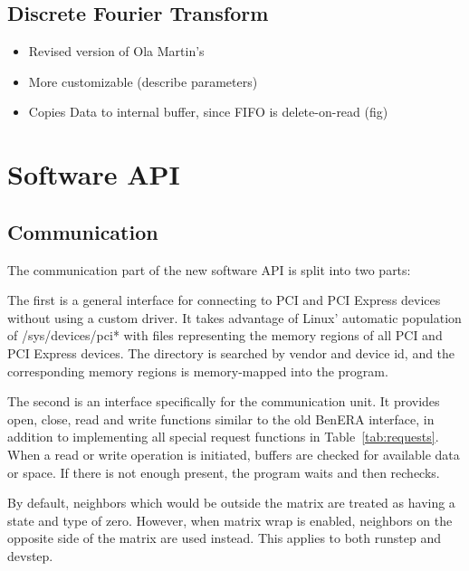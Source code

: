 \subsection{Discrete Fourier Transform}

\begin{itemize}
    \item Revised version of Ola Martin's
    \item More customizable (describe parameters)
    \item Copies Data to internal buffer, since FIFO is delete-on-read (fig)
\end{itemize}


\section{Software API}

\TODO

\subsection{Communication}

The communication part of the new software API is split into two parts:

The first is a general interface for connecting to PCI and PCI Express devices without using a custom driver.
It takes advantage of Linux' automatic population of /sys/devices/pci* with files representing the memory regions of all PCI and PCI Express devices.
The directory is searched by vendor and device id, and the corresponding memory regions is memory-mapped into the program.

The second is an interface specifically for the communication unit.
It provides open, close, read and write functions similar to the old BenERA interface, in addition to implementing all special request functions in Table~\ref{tab:requests}.
When a read or write operation is initiated, buffers are checked for available data or space.
If there is not enough present, the program waits and then rechecks.


By default, neighbors which would be outside the matrix are treated as having a state and type of zero.
However, when matrix wrap is enabled, neighbors on the opposite side of the matrix are used instead.
This applies to both runstep and devstep.
